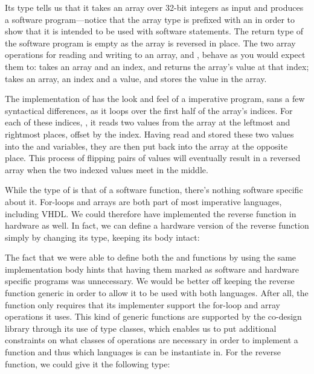\documentclass[../main.tex]{subfiles}
\begin{document}
\noindent Its type tells us that it takes an array over 32-bit integers as input and produces a software program---notice that the array type  is prefixed with an  in order to show that it is intended to be used with software statements. The return type of the software program is empty as the array is reversed in place. The two array operations for reading and writing to an array,  and , behave as you would expect them to:  takes an array and an index, and returns the array's value at that index;  takes an array, an index and a value, and stores the value in the array.

The implementation of  has the look and feel of a imperative program, sans a few syntactical differences, as it loops over the first half of the array's indices. For each of these indices, , it reads two values from the array at the leftmost and rightmost places, offset by the index. Having read and stored these two values into the  and  variables, they are then put back into the array at the opposite place. This process of flipping pairs of values will eventually result in a reversed array when the two indexed values meet in the middle. 

While the type of  is that of a software function, there's nothing software specific about it. For-loops and arrays are both part of most imperative languages, including VHDL. We could therefore have implemented the reverse function in hardware as well. In fact, we can define a hardware version of the reverse function simply by changing its type, keeping its body intact:


The fact that we were able to define both the  and  functions by using the same implementation body hints that having them marked as software and hardware specific programs was unnecessary. We would be better off keeping the reverse function generic in order to allow it to be used with both languages. After all, the function only requires that its implementer support the for-loop and array operations it uses. This kind of generic functions are supported by the co-design library through its use of type classes, which enables us to put additional constraints on what classes of operations are necessary in order to implement a function and thus which languages is can be instantiate in. For the reverse function, we could give it the following type:
\end{document}
